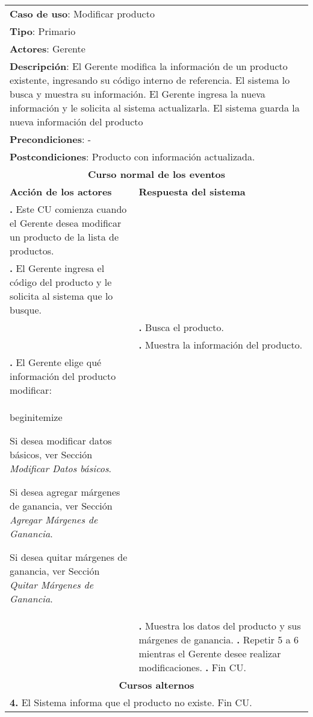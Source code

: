\documentclass[12pt]{extarticle}
\begin{document}
    \newcommand\inc{\stepcounter{step}\textbf{\thestep. }}
    \newcommand\resetinc{\setcounter{step}{0}}
    \newcommand\raya{\noindent\rule{169mm}{0.8mm}\\}


\begin{longtable}{ |p{8cm}|p{8cm}| }
		\hline
		\multicolumn{2}{|p{16cm}|}{\textbf{Caso de uso}: Modificar producto}\\
		\multicolumn{2}{|p{16cm}|}{\textbf{Tipo}: Primario}\\
		\multicolumn{2}{|p{16cm}|}{\textbf{Actores}: Gerente}\\
		\multicolumn{2}{|p{16cm}|}{\textbf{Descripción}: El Gerente modifica la información de un producto existente, ingresando su código interno de referencia. El sistema lo busca y muestra su información. El Gerente ingresa la nueva información y le solicita al sistema actualizarla. El sistema guarda la nueva información del producto}\\
		\multicolumn{2}{|p{16cm}|}{\textbf{Precondiciones}: - }\\
		\multicolumn{2}{|p{16cm}|}{\textbf{Postcondiciones}: Producto con información actualizada.}\\
		\hline
		\multicolumn{2}{|c|}{\textbf{Curso normal de los eventos}}\\
		\hline
		\textbf{Acción de los actores} & \textbf{Respuesta del sistema}\\
		\hline
			\inc Este CU comienza cuando el Gerente desea modificar un producto de la lista de productos.&\\
			\hline
			\inc El Gerente ingresa el código del producto y le solicita al sistema que lo busque.&\\
			\hline
			& \inc Busca el producto.\\
			\hline
      & \inc Muestra la información del producto.\\
      \hline
			\inc El Gerente elige qué información del producto modificar:
        \\begin{itemize}
          \item Si desea modificar datos básicos, ver Sección \textit{Modificar Datos básicos}.
          \item Si desea agregar márgenes de ganancia, ver Sección \textit{Agregar Márgenes de Ganancia}.
          \item Si desea quitar márgenes de ganancia, ver Sección \textit{Quitar Márgenes de Ganancia}.
        \end{itemize}
      &\\
      \hline
      & \inc Muestra los datos del producto y sus márgenes de ganancia.
			\hline
			\inc Repetir 5 a 6 mientras el Gerente desee realizar modificaciones.
			\hline
			\inc Fin CU. & \\
		\hline
		\multicolumn{2}{|c|}{\textbf{Cursos alternos}}\\
		\hline
    \multicolumn{2}{|p{16cm}|}{\textbf{4. }El Sistema informa que el producto no existe. Fin CU.}\\
	\end{longtable}
	    \resetinc{}
\end{document}
